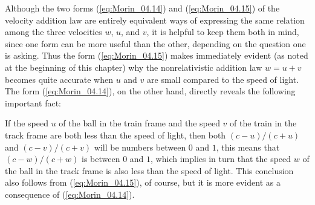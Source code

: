 Although the two forms (\ref{eq:Morin_04.14}) and (\ref{eq:Morin_04.15}) of the velocity addition law are entirely equivalent ways of expressing the same relation among the three velocities $w$, $u$, and $v$, it is helpful to keep them both in mind, since one form can be more useful than the other, depending on the question one is asking. Thus the form (\ref{eq:Morin_04.15}) makes immediately evident (as noted at the beginning of this chapter) why the nonrelativistic addition law $w = u + v$ becomes quite accurate when $u$ and $v$ are small compared to the speed of light. The form (\ref{eq:Morin_04.14}), on the other hand, directly reveals the following important fact:

If the speed $u$ of the ball in the train frame and the speed $v$ of the train in the track frame are both less than the speed of light, then both $(c - u)/(c + u)$ and $(c - v)/(c + v)$ will be numbers between $0$ and $1$, this means that $(c - w)/(c + w)$ is between $0$ and $1$, which implies in turn that the speed $w$ of the ball in the track frame is also less than the speed of light. This conclusion also follows from (\ref{eq:Morin_04.15}), of course, but it is more evident as a consequence of (\ref{eq:Morin_04.14}).


 





